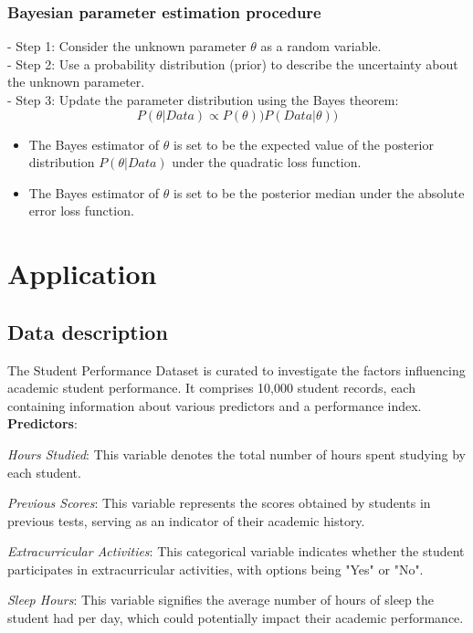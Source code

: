 \documentclass[12pt]{article}
\begin{document}
		\subsubsection{Bayesian parameter estimation procedure}
			
	- Step 1: Consider the unknown parameter $\theta$ as a random variable.
		\\
	- Step 2:  Use a probability distribution (prior) to describe the uncertainty about the unknown parameter.
		\\	
	- Step 3:  Update the parameter distribution using the Bayes
			theorem:
			$$P(\theta|Data) \propto P(\theta)) P(Data|\theta))$$
			
	\begin{itemize}
		\item The Bayes estimator of $\theta$ is set to be the expected value of
		the posterior distribution $P(\theta|Data)$ under the quadratic loss
		function.
		
		\item The Bayes estimator of $\theta$ is set to be the posterior median
		under the absolute error loss function.
	\end{itemize}
			 	
	\section{Application}
	\subsection{Data description}
	The Student Performance Dataset is curated to investigate the factors influencing academic student performance. It comprises 10,000 student records, each containing information about various predictors and a performance index.
	\\
	\textbf{Predictors}:
	
	\textit{Hours Studied}: This variable denotes the total number of hours spent studying by each student.
	
	\textit{Previous Scores}: This variable represents the scores obtained by students in previous tests, serving as an indicator of their academic history.
	
	\textit{Extracurricular Activities}: This categorical variable indicates whether the student participates in extracurricular activities, with options being "Yes" or "No".
	
	\textit{Sleep Hours}: This variable signifies the average number of hours of sleep the student had per day, which could potentially impact their academic performance.
	
\end{document}
